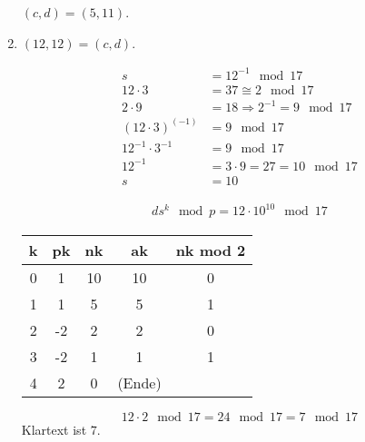 \begin{enumerate}[label=\alph*)]
$(c, d) = (5, 11)$.
\item $(12,12) = (c,d)$.

\begin{align*}
s &= 12^{-1} \mod 17 \\
12\cdot 3 &= 37 \cong 2 \mod 17 \\
2\cdot 9 &= 18 \Rightarrow 2^{-1} = 9 \mod 17 \\
(12\cdot3)^(-1) &= 9 \mod 17 \\
12^{-1} \cdot 3^{-1} &= 9 \mod 17 \\
12^{-1} &= 3 \cdot 9 = 27 = 10 \mod 17 \\
s &= 10
\end{align*}

\begin{align*}
ds^{k} \mod p = 12 \cdot 10^{10} \mod 17
\end{align*}

\begin{tabular}{c|c|c|c|c}
k & pk & nk & ak & nk mod 2 \\
\hline
0 & 1 & 10 & 10 & 0 \\
1 & 1 & 5 & 5 & 1 \\
2 & -2 & 2 & 2 & 0 \\
3 & -2 & 1 & 1 & 1 \\
4 & 2 & 0 & (Ende)
\end{tabular}

\[
12\cdot 2 \mod 17 = 24 \mod 17 = 7 \mod 17
\]
Klartext ist $7$.

\end{enumerate}


























